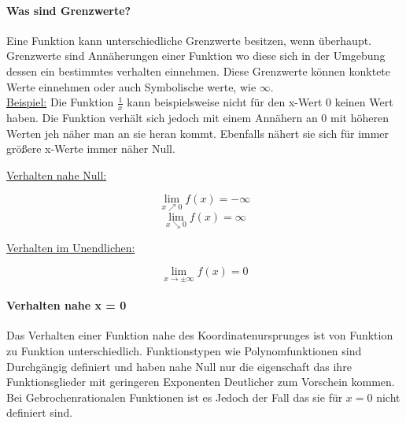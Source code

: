 \documentclass{article}
\begin{document}
		\paragraph{Was sind Grenzwerte?} \label{Definitionsbereich}
			Eine Funktion kann unterschiedliche Grenzwerte besitzen, wenn überhaupt. Grenzwerte sind Annäherungen einer Funktion wo diese sich in der Umgebung dessen ein bestimmtes verhalten einnehmen. Diese Grenzwerte können konktete Werte einnehmen oder auch Symbolische werte, wie $\infty$. \\
			\underline{Beispiel:} Die Funktion $ \frac {1} {x}$ kann beispielsweise nicht für den x-Wert $0$ keinen Wert haben. Die Funktion verhält sich jedoch mit einem Annähern an $0$ mit höheren Werten jeh näher man an sie heran kommt. Ebenfalls nähert sie sich für immer größere x-Werte immer näher Null.
			
		\begin{multicols}{2}
		
		
		\underline{Verhalten nahe Null:}
		
		\[\lim\limits_{x \nearrow 0} f(x) = - \infty\]
		\[\lim\limits_{x \searrow 0} f(x) =  \infty\]
		
		\underline{Verhalten im Unendlichen:}
		
		\[\lim\limits_{x \rightarrow \pm \infty} f(x) = 0\]
		
		\end{multicols}
				
		\paragraph{Verhalten nahe x = 0}\label{Verhalten nahe Null}
			Das Verhalten einer Funktion nahe des Koordinatenursprunges ist von Funktion zu Funktion unterschiedlich. Funktionstypen wie Polynomfunktionen sind Durchgängig definiert und haben nahe Null nur die eigenschaft das ihre Funktionsglieder mit geringeren Exponenten Deutlicher zum Vorschein kommen. Bei Gebrochenrationalen Funktionen ist es Jedoch der Fall das sie für $x = 0$ nicht definiert sind.\\
			
\end{document}
